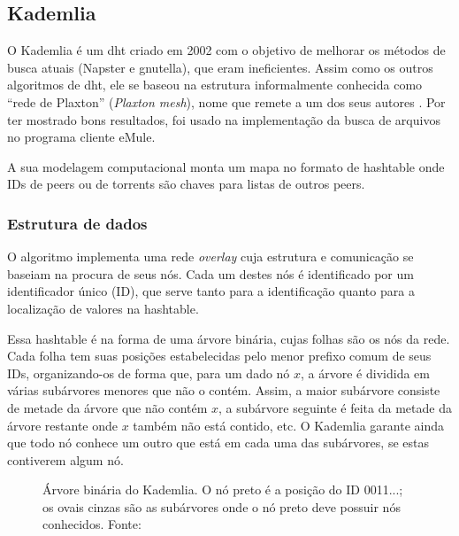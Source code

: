 \subsection*{Kademlia}

O Kademlia é um \gls*{dht} criado em 2002 \cite{artigo:kademlia} com o objetivo de
melhorar os métodos de busca atuais (Napster e \gls*{gnutella}), que eram ineficientes.
Assim como os outros algoritmos de \gls*{dht}, ele se baseou na estrutura informalmente
conhecida como \enquote{rede de Plaxton} (\emph{Plaxton mesh}), nome que remete a um
dos seus autores \cite{artigo:dht}. Por ter mostrado bons resultados, foi usado na
implementação da busca de arquivos no programa cliente eMule.

A sua modelagem computacional monta um mapa no formato de \gls*{hashtable} onde IDs de
\glspl*{peer} ou de \glspl*{torrent} são chaves para listas de outros \glspl*{peer}.

\subsubsection*{Estrutura de dados}

O algoritmo implementa uma rede \emph{overlay} cuja estrutura e comunicação se baseiam
na procura de seus nós. Cada um destes nós é identificado por um identificador único
(ID), que serve tanto para a identificação quanto para a localização de valores na
\gls*{hashtable}.

Essa \gls*{hashtable} é na forma de uma árvore binária, cujas folhas são os nós da rede.
Cada folha tem suas posições estabelecidas pelo menor prefixo comum de seus IDs,
organizando-os de forma que, para um dado nó $x$, a árvore é dividida em várias
subárvores menores que não o contém. Assim, a maior subárvore consiste de metade da
árvore que não contém $x$, a subárvore seguinte é feita da metade da árvore restante
onde $x$ também não está contido, etc. O Kademlia garante ainda que todo nó conhece um
outro que está em cada uma das subárvores, se estas contiverem algum nó.

\begin{figure}[ht!]
    \centering
    \caption{Árvore binária do Kademlia. O nó preto é a posição do ID 0011...; os ovais
    cinzas são as subárvores onde o nó preto deve possuir nós conhecidos. Fonte:
    \cite{artigo:kademlia}}
    \label{fig:dht-arvore}
\end{figure}

